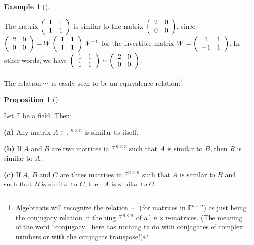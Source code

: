 \documentclass[numbers=enddot,12pt,final,onecolumn,notitlepage]{scrartcl}%
\numberwithin{exer}{subsection}
\theoremstyle{definition}
\newtheorem{prop}[theo]{Proposition}
\newenvironment{proposition}[1][]
{\begin{prop}[#1]\begin{leftbar}}
{\end{leftbar}\end{prop}}
\newtheorem{exam}[theo]{Example}
\newenvironment{example}[1][]
{\begin{exam}[#1]\begin{leftbar}}
{\end{leftbar}\end{exam}}
\begin{document}
\begin{example}
The matrix $\left(
\begin{array}
[c]{cc}%
1 & 1\\
1 & 1
\end{array}
\right)  $ is similar to the matrix $\left(
\begin{array}
[c]{cc}%
2 & 0\\
0 & 0
\end{array}
\right)  $, since $\left(
\begin{array}
[c]{cc}%
2 & 0\\
0 & 0
\end{array}
\right)  =W\left(
\begin{array}
[c]{cc}%
1 & 1\\
1 & 1
\end{array}
\right)  W^{-1}$ for the invertible matrix $W=\left(
\begin{array}
[c]{cc}%
1 & 1\\
-1 & 1
\end{array}
\right)  $. In other words, we have $\left(
\begin{array}
[c]{cc}%
1 & 1\\
1 & 1
\end{array}
\right)  \sim\left(
\begin{array}
[c]{cc}%
2 & 0\\
0 & 0
\end{array}
\right)  $.
\end{example}

The relation $\sim$\ is easily seen to be an equivalence
relation:\footnote{Algebraists will recognize the relation $\sim$\ (for
matrices in $\mathbb{F}^{n\times n}$) as just being the conjugacy relation in
the ring $\mathbb{F}^{n\times n}$ of all $n\times n$-matrices. (The meaning of
the word \textquotedblleft conjugacy\textquotedblright\ here has nothing to do
with conjugates of complex numbers or with the conjugate transpose!)}

\begin{proposition}
\label{prop.schurtri.similar.eqrel}Let $\mathbb{F}$ be a field. Then: \medskip

\textbf{(a)} Any matrix $A\in\mathbb{F}^{n\times n}$ is similar to itself.
\medskip

\textbf{(b)} If $A$ and $B$ are two matrices in $\mathbb{F}^{n\times n}$ such
that $A$ is similar to $B$, then $B$ is similar to $A$. \medskip

\textbf{(c)} If $A$, $B$ and $C$ are three matrices in $\mathbb{F}^{n\times
n}$ such that $A$ is similar to $B$ and such that $B$ is similar to $C$, then
$A$ is similar to $C$.
\end{proposition}
\end{document}
